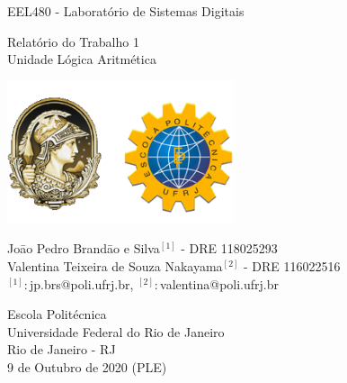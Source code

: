 \begin{titlepage}
   \begin{center}
        \vspace{1cm}   
        \LARGE{EEL480 - Laboratório de Sistemas Digitais}
       

        \vspace{0.5cm}
        \Large{Relatório do Trabalho 1 \\ Unidade Lógica Aritmética}
            
        \vspace{2.5cm}
     
        \begin{center}
           \includegraphics[width=0.5\textwidth]{img/logos.png}
        \end{center}
       
        \vspace{2.5cm}
       
        \large{Joāo Pedro Brandāo e Silva$^{[1]}$ - DRE 118025293 \\ Valentina    Teixeira de Souza Nakayama$^{[2]}$ - DRE 116022516 \\
        $^{[1]}: $jp.brs@poli.ufrj.br, $^{[2]}: $valentina@poli.ufrj.br}
       
        \vfill
        Escola Politécnica\\
        Universidade Federal do Rio de Janeiro\\
        Rio de Janeiro - RJ\\
        9 de Outubro de 2020 (PLE)
            
   \end{center}
\end{titlepage}